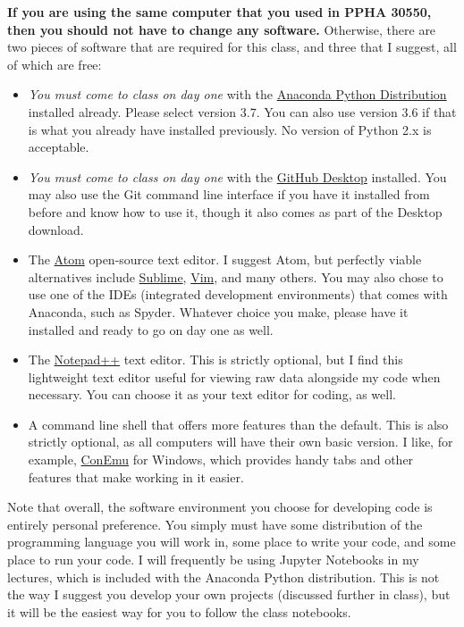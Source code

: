 \documentclass{article}
\begin{document}
\textbf{If you are using the same computer that you used in PPHA 30550, then you should not have to change any software.}  Otherwise, there are two pieces of software that are required for this class, and three that I suggest, all of which are free:
\begin{itemize}
	\item \emph{You must come to class on day one} with the \href{https://www.anaconda.com/distribution/}{Anaconda Python Distribution} installed already.  Please select version 3.7.  You can also use version 3.6 if that is what you already have installed previously.  No version of Python 2.x is acceptable.
	\item \emph{You must come to class on day one} with the \href{https://desktop.github.com/}{GitHub Desktop} installed.  You may also use the Git command line interface if you have it installed from before and know how to use it, though it also comes as part of the Desktop download.
	\item The \href{https://atom.io/}{Atom} open-source text editor. I suggest Atom, but perfectly viable alternatives include \href{https://www.sublimetext.com/}{Sublime}, \href{https://www.vim.org/}{Vim}, and many others.  You may also chose to use one of the IDEs (integrated development environments) that comes with Anaconda, such as Spyder.  Whatever choice you make, please have it installed and ready to go on day one as well.  
	\item The \href{https://notepad-plus-plus.org/}{Notepad++} text editor.  This is strictly optional, but I find this lightweight text editor useful for viewing raw data alongside my code when necessary.  You can choose it as your text editor for coding, as well.
	\item A command line shell that offers more features than the default.  This is also strictly optional, as all computers will have their own basic version.  I like, for example, \href{https://conemu.github.io/}{ConEmu} for Windows, which provides handy tabs and other features that make working in it easier.
\end{itemize}

Note that overall, the software environment you choose for developing code is entirely personal preference.  You simply must have some distribution of the programming language you will work in, some place to write your code, and some place to run your code.  I will frequently be using Jupyter Notebooks in my lectures, which is included with the Anaconda Python distribution.  This is not the way I suggest you develop your own projects (discussed further in class), but it will be the easiest way for you to follow the class notebooks.
	
\end{document}

